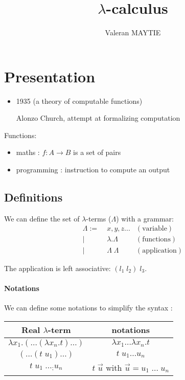 \documentclass{article}
\title{$\lambda$-calculus}
\author{Valeran MAYTIE}
\date{}
\theoremstyle{plain}
\theoremstyle{plain}
\begin{document}
  \maketitle

  \tableofcontents

  \section{Presentation}

  \begin{itemize}
    \item 1935 (a theory of computable functions)

      Alonzo Church, attempt at formalizing computation
  \end{itemize}

  Functions:
  \begin{itemize}
    \item maths : $f : A \to B$ is a set of pairs
    \item programming : instruction to compute an output
  \end{itemize}

  \subsection{Definitions}

  We can define the set of $\lambda$-terms ($\Lambda$) with a grammar:
  \begin{align*}
    \Lambda :=&\; x, y, z ...         & (\text{variable}) \\
             |&\; \lambda. \Lambda    & (\text{functions}) \\
             |&\; \Lambda\; \Lambda   & (\text{application})
  \end{align*}

  The application is left associative: $(l_1\; l_2)\; l_3$.

  \paragraph{Notations} We can define some notations to simplify the syntax :

  \begin{center}
  \begin{tabular}{ c|c }
    Real $\lambda$-term & notations \\
    \hline
    $\lambda x_1.(\ldots(\lambda x_n. t)\ldots)$ & $\lambda x_1 \ldots
    \lambda x_n. t$ \\
    $(\ldots (t\; u_1)\ldots)$ & $t\;u_1 \ldots u_n$ \\
    $t\; u_1\; \ldots_; u_n$ & $t\; \vec{u}$ with $\vec u = u_1\; \ldots\; u_n$
  \end{tabular}
  \end{center}
\end{document}
